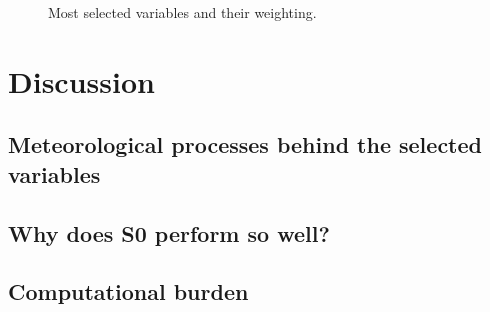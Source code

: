 \documentclass[draft]{agujournal2019}
\begin{document}
\begin{figure}[hbt]
	\noindent{}
	\caption{Most selected variables and their weighting.}
	\label{fig_variables_weights}
\end{figure}


\section{Discussion}
\label{discussion}

\subsection{Meteorological processes behind the selected variables}


\subsection{Why does S0 perform so well?}


\subsection{Computational burden}
\end{document}
